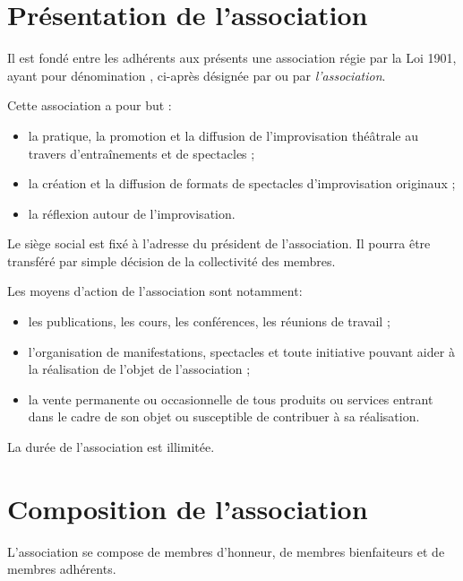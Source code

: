 \setcounter{article}{1}
\section{Présentation de l'association}
\label{sec:constitution}
Il est fondé entre les adhérents aux présents \statuts{} une association
régie par la Loi 1901, ayant pour dénomination \textit{\metae{}}, ci-après désignée par \textit{\meta{}} ou par \textit{l'association}.

\label{sec:but}

Cette association a pour but :
\begin{itemize}
\item la pratique, la promotion et la diffusion de l'improvisation théâtrale au travers d'entraînements et de spectacles ;
\item la création et la diffusion de formats de spectacles d'improvisation originaux ;
\item la réflexion autour de l'improvisation.
\end{itemize}

\label{sec:siege}

Le siège social est fixé à l'adresse du président de l'association. Il
pourra être transféré par simple décision de la collectivité des
membres.

\label{sec:moyens}

Les moyens d'action de l'association sont notamment:
\begin{itemize}
\item les publications, les cours, les conférences, les réunions de
travail ;
\item l'organisation de manifestations, spectacles et toute initiative
pouvant aider à la réalisation de l'objet de l'association ;
\item la vente permanente ou occasionnelle de tous produits ou
services entrant dans le cadre de son objet ou susceptible de
contribuer à sa réalisation.
\end{itemize}

\label{sec:duree}
La durée de l'association est illimitée.

\section{Composition de l'association}

\label{sec:composition}
L'association se compose de membres d'honneur, de membres bienfaiteurs
et de membres adhérents.

